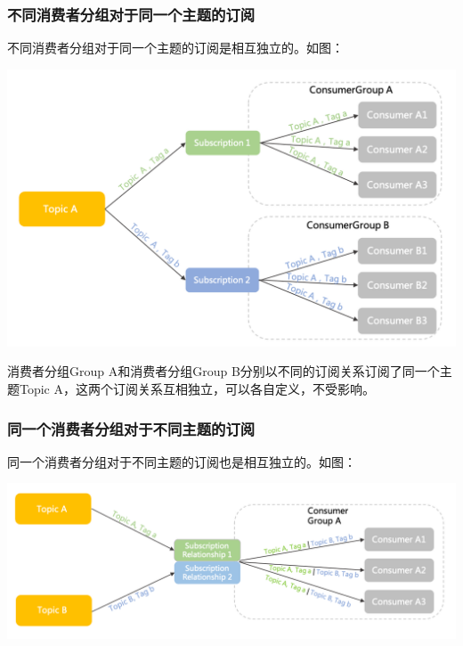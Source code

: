 \documentclass[11pt, a4paper, oneside, fontset=none]{ctexbook}
\begin{document}
\subsubsection{不同消费者分组对于同一个主题的订阅}
不同消费者分组对于同一个主题的订阅是相互独立的。如图：
\begin{center}
  \begin{minipage}{\textwidth}
    \center
    \includegraphics[width=\textwidth]{picture/不同消费者分组对于同一个主题的订阅相互独立.png}
    \captionsetup{hypcap=false}
    \label{fig:不同消费者分组对于同一个主题的订阅}
  \end{minipage}
\end{center}

消费者分组Group A和消费者分组Group B分别以不同的订阅关系订阅了同一个主题Topic A，这两个订阅关系互相独立，可以各自定义，不受影响。

\subsubsection{同一个消费者分组对于不同主题的订阅}
同一个消费者分组对于不同主题的订阅也是相互独立的。如图：
\begin{center}
  \begin{minipage}{\textwidth}
    \center
    \includegraphics[width=\textwidth]{picture/同一个消费者分组对于不同主题的订阅.png}
    \captionsetup{hypcap=false}
    \label{fig:同一个消费者分组对于不同主题的订阅}
  \end{minipage}
\end{center}
\end{document}
